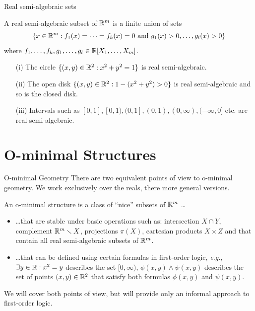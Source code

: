 \documentclass{beamer}
\begin{document}
\begin{frame}{Real semi-algebraic sets} 
  \begin{definition}
    A \alert{real semi-algebraic} subset of ${\mathbb{R}}^m$ is a finite union
    of sets    
    \begin{equation*}
      \{x\in{\mathbb{R}}^m :f_1(x) =\cdots = f_k(x) = 0 \text{ and }
      g_1(x)>0,\ldots,g_l(x)>0\}
    \end{equation*}
    where $f_1,\ldots,f_k,g_1,\ldots,g_l\in {\mathbb{R}}[X_1,\ldots,X_m]$.
  \end{definition}

  \begin{example}
    \begin{enumerate}
    \item [(i)] The circle $\{(x,y)\in{\mathbb{R}}^2: x^2+y^2=1\}$ is
      real semi-algebraic.
    \item[(ii)] The open disk $\{(x,y) \in{\mathbb{R}}^2 : 1-(x^2+y^2)>0\}$ is
      real semi-algebraic and so is the closed disk.
    \item[(iii)] Intervals such as
      $[0,1],[0,1),(0,1],(0,1),(0,\infty),(-\infty,0]$ etc. are real
      semi-algebraic. 
    \end{enumerate}
  \end{example}
\end{frame}

\section{O-minimal Structures}

\begin{frame}{O-minimal Geometry}
  There are two equivalent
  points of view to o-minimal geometry. We work exclusively
  over the reals,  there more general versions.

  An o-minimal structure is a class of
    ``nice'' subsets of ${\mathbb{R}}^m$ \ldots
  \begin{itemize}
  \item \ldots  that are stable under basic operations
    such as: \alert{intersection} $X\cap Y$, \alert{complement}
    ${\mathbb{R}}^m\smallsetminus X$,
    \alert{projections} $\pi(X)$, \alert{cartesian products} $X\times
    Z$ and that contain all real semi-algebraic subsets of ${\mathbb{R}}^m$.

  \item \ldots that can be defined using certain formulas in
    first-order
    logic, \textit{e.g.}, 
    $\exists y\in {\mathbb{R}} : x^2=y$ describes the set $[0,\infty)$,
    $\phi(x,y)\wedge \psi(x,y)$ describes the set of points
    $(x,y)\in{\mathbb{R}}^2$ that satisfy both formulas $\phi(x,y)$ and
    $\psi(x,y)$. 
  \end{itemize}

  We will cover both points of view, but will provide only an informal
  approach to first-order logic. 
\end{frame}
\end{document}
